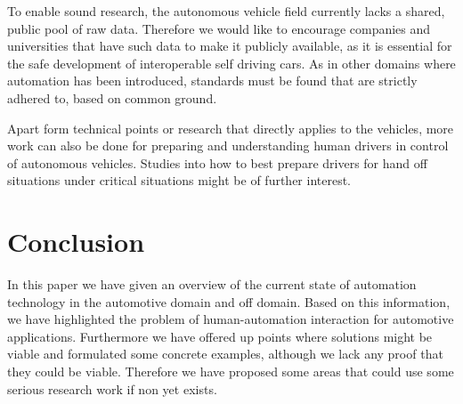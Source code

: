 \documentclass{acm_proc_article-sp}
\begin{document}
To enable sound research, the autonomous vehicle field currently lacks a shared, public pool of raw data.
Therefore we would like to encourage companies and universities that have such data to make it publicly available, as it is essential for the safe development of interoperable self driving cars.
As in other domains where automation has been introduced, standards must be found that are strictly adhered to, based on common ground.

Apart form technical points or research that directly applies to the vehicles, more work can also be done for preparing and understanding human drivers in control of autonomous vehicles.
Studies into how to best prepare drivers for hand off situations under critical situations might be of further interest.

\section{Conclusion}

In this paper we have given an overview of the current state of automation technology in the automotive domain and off domain.
Based on this information, we have highlighted the problem of human-automation interaction for automotive applications.
Furthermore we have offered up points where solutions might be viable and formulated some concrete examples, although we lack any proof that they could be viable.
Therefore we have proposed some areas that could use some serious research work if non yet exists.

{\small

  
}

\balancecolumns
\end{document}

